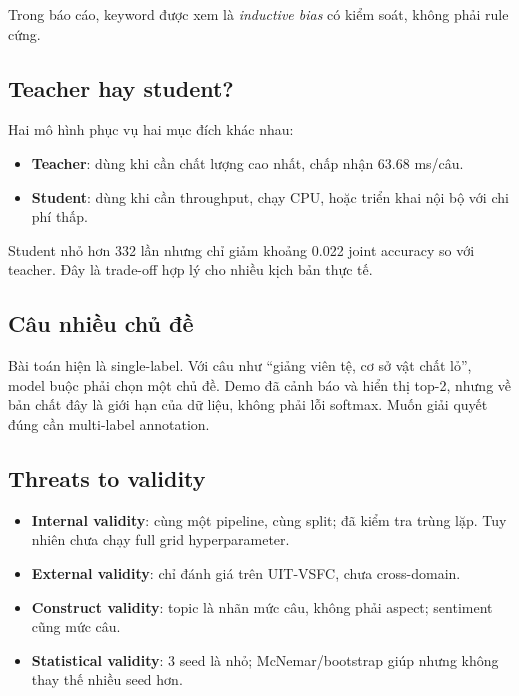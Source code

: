 \documentclass[12pt,a4paper]{report}
\begin{document}
Trong báo cáo, keyword được xem là \emph{inductive bias} có kiểm soát, không phải rule cứng.

\subsection{Teacher hay student?}

Hai mô hình phục vụ hai mục đích khác nhau:

\begin{itemize}[leftmargin=1.2cm]
  \item \textbf{Teacher}: dùng khi cần chất lượng cao nhất, chấp nhận 63.68 ms/câu.
  \item \textbf{Student}: dùng khi cần throughput, chạy CPU, hoặc triển khai nội bộ với chi phí thấp.
\end{itemize}

Student nhỏ hơn 332 lần nhưng chỉ giảm khoảng 0.022 joint accuracy so với teacher. Đây là trade-off hợp lý cho nhiều kịch bản thực tế.

\subsection{Câu nhiều chủ đề}

Bài toán hiện là single-label. Với câu như “giảng viên tệ, cơ sở vật chất lỏ”, model buộc phải chọn một chủ đề. Demo đã cảnh báo và hiển thị top-2, nhưng về bản chất đây là giới hạn của dữ liệu, không phải lỗi softmax. Muốn giải quyết đúng cần multi-label annotation.

\subsection{Threats to validity}

\begin{itemize}[leftmargin=1.2cm]
  \item \textbf{Internal validity}: cùng một pipeline, cùng split; đã kiểm tra trùng lặp. Tuy nhiên chưa chạy full grid hyperparameter.
  \item \textbf{External validity}: chỉ đánh giá trên UIT-VSFC, chưa cross-domain.
  \item \textbf{Construct validity}: topic là nhãn mức câu, không phải aspect; sentiment cũng mức câu.
  \item \textbf{Statistical validity}: 3 seed là nhỏ; McNemar/bootstrap giúp nhưng không thay thế nhiều seed hơn.
\end{itemize}
\end{document}
